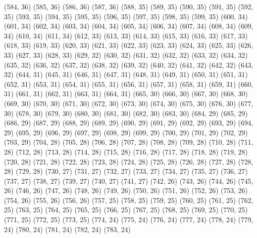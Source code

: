 {   (584, 36)
   (585, 36)
   (586, 36)
   (587, 36)
   (588, 35)
   (589, 35)
   (590, 35)
   (591, 35)
   (592, 35)
   (593, 35)
   (594, 35)
   (595, 35)
   (596, 35)
   (597, 35)
   (598, 35)
   (599, 35)
   (600, 34)
   (601, 34)
   (602, 34)
   (603, 34)
   (604, 34)
   (605, 34)
   (606, 34)
   (607, 34)
   (608, 34)
   (609, 34)
   (610, 34)
   (611, 34)
   (612, 33)
   (613, 33)
   (614, 33)
   (615, 33)
   (616, 33)
   (617, 33)
   (618, 33)
   (619, 33)
   (620, 33)
   (621, 33)
   (622, 33)
   (623, 33)
   (624, 33)
   (625, 33)
   (626, 33)
   (627, 33)
   (628, 33)
   (629, 32)
   (630, 32)
   (631, 32)
   (632, 32)
   (633, 32)
   (634, 32)
   (635, 32)
   (636, 32)
   (637, 32)
   (638, 32)
   (639, 32)
   (640, 32)
   (641, 32)
   (642, 32)
   (643, 32)
   (644, 31)
   (645, 31)
   (646, 31)
   (647, 31)
   (648, 31)
   (649, 31)
   (650, 31)
   (651, 31)
   (652, 31)
   (653, 31)
   (654, 31)
   (655, 31)
   (656, 31)
   (657, 31)
   (658, 31)
   (659, 31)
   (660, 31)
   (661, 31)
   (662, 31)
   (663, 31)
   (664, 31)
   (665, 30)
   (666, 30)
   (667, 30)
   (668, 30)
   (669, 30)
   (670, 30)
   (671, 30)
   (672, 30)
   (673, 30)
   (674, 30)
   (675, 30)
   (676, 30)
   (677, 30)
   (678, 30)
   (679, 30)
   (680, 30)
   (681, 30)
   (682, 30)
   (683, 30)
   (684, 29)
   (685, 29)
   (686, 29)
   (687, 29)
   (688, 29)
   (689, 29)
   (690, 29)
   (691, 29)
   (692, 29)
   (693, 29)
   (694, 29)
   (695, 29)
   (696, 29)
   (697, 29)
   (698, 29)
   (699, 29)
   (700, 29)
   (701, 29)
   (702, 29)
   (703, 29)
   (704, 28)
   (705, 28)
   (706, 28)
   (707, 28)
   (708, 28)
   (709, 28)
   (710, 28)
   (711, 28)
   (712, 28)
   (713, 28)
   (714, 28)
   (715, 28)
   (716, 28)
   (717, 28)
   (718, 28)
   (719, 28)
   (720, 28)
   (721, 28)
   (722, 28)
   (723, 28)
   (724, 28)
   (725, 28)
   (726, 28)
   (727, 28)
   (728, 28)
   (729, 28)
   (730, 27)
   (731, 27)
   (732, 27)
   (733, 27)
   (734, 27)
   (735, 27)
   (736, 27)
   (737, 27)
   (738, 27)
   (739, 27)
   (740, 27)
   (741, 27)
   (742, 26)
   (743, 26)
   (744, 26)
   (745, 26)
   (746, 26)
   (747, 26)
   (748, 26)
   (749, 26)
   (750, 26)
   (751, 26)
   (752, 26)
   (753, 26)
   (754, 26)
   (755, 26)
   (756, 26)
   (757, 25)
   (758, 25)
   (759, 25)
   (760, 25)
   (761, 25)
   (762, 25)
   (763, 25)
   (764, 25)
   (765, 25)
   (766, 25)
   (767, 25)
   (768, 25)
   (769, 25)
   (770, 25)
   (771, 25)
   (772, 25)
   (773, 25)
   (774, 24)
   (775, 24)
   (776, 24)
   (777, 24)
   (778, 24)
   (779, 24)
   (780, 24)
   (781, 24)
   (782, 24)
   (783, 24)
}
